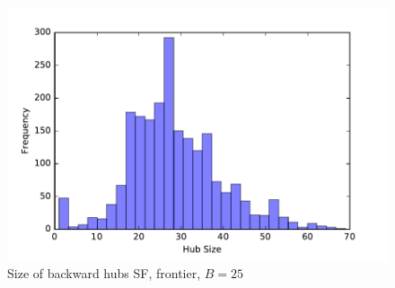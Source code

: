 \begin{figure} \caption{Size of backward hubs SF, frontier, $B=25$}\label{fig:SF_bwd_size}
\begin{center}
\includegraphics[scale=0.5]{TexImg/SF_bwd_hub_size.pdf}
\end{center}
\end{figure}

